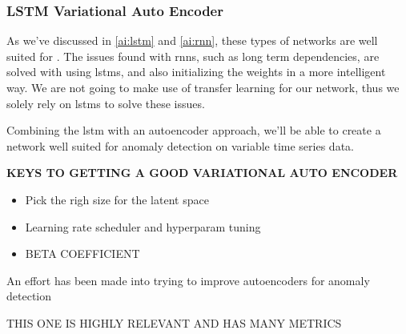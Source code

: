 \subsubsection{LSTM Variational Auto Encoder}

As we've discussed in \ref{ai:lstm} and \ref{ai:rnn}, these types of networks are well suited for . The issues found with \acrshort{rnn}s, such as long term dependencies, are solved with using \acrshort{lstm}s, and also initializing the weights in a more intelligent way. We are not going to make use of transfer learning for our network, thus we solely rely on \acrshort{lstm}s to solve these issues.

Combining the \acrshort{lstm} with an autoencoder approach, we'll be able to create a network well suited for anomaly detection on variable time series data.

\textbf{KEYS TO GETTING A GOOD VARIATIONAL AUTO ENCODER}

\begin{itemize}
    \item Pick the righ size for the latent space
    \item Learning rate scheduler  and hyperparam tuning 
    \item BETA COEFFICIENT
\end{itemize}

An effort has been made into trying to improve autoencoders for anomaly detection \cite{tan2023improving}

THIS ONE IS HIGHLY RELEVANT AND HAS MANY METRICS \cite{s23021009}